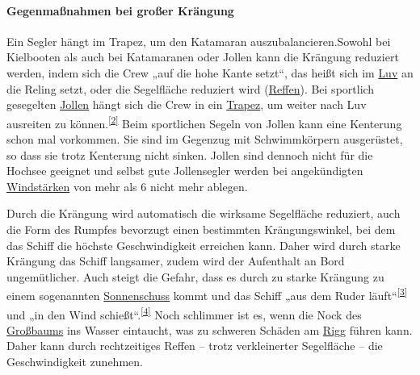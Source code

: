 \paragraph{Gegenmaßnahmen bei großer Krängung}

Ein Segler hängt im Trapez, um den Katamaran auszubalancieren.Sowohl bei Kielbooten als auch bei Katamaranen oder Jollen kann die Krängung reduziert werden, indem sich die Crew „auf die hohe Kante setzt“, das heißt sich im \href{https://de.wikipedia.org/wiki/Luv_und_Lee}{Luv} an die Reling setzt, oder die Segelfläche reduziert wird (\href{https://de.wikipedia.org/wiki/Reffen}{Reffen}). Bei sportlich gesegelten \href{https://de.wikipedia.org/wiki/Jolle}{Jollen} hängt sich die Crew in ein \href{https://de.wikipedia.org/wiki/Trapez_(Segeln)}{Trapez}, um weiter nach Luv ausreiten zu können.\textsuperscript{\href{https://de.wikipedia.org/wiki/Stabilit\%C3\%A4t_(Schiffsk\%C3\%B6rper)\#cite_note-2}{[2]}} Beim sportlichen Segeln von Jollen kann eine Kenterung schon mal vorkommen. Sie sind im Gegenzug mit Schwimmkörpern ausgerüstet, so dass sie trotz Kenterung nicht sinken. Jollen sind dennoch nicht für die Hochsee geeignet und selbst gute Jollensegler werden bei angekündigten \href{https://de.wikipedia.org/wiki/Beaufort-Skala}{Windstärken} von mehr als 6 nicht mehr ablegen. 

Durch die Krängung wird automatisch die wirksame Segelfläche reduziert, auch die Form des Rumpfes bevorzugt einen bestimmten Krängungswinkel, bei dem das Schiff die höchste Geschwindigkeit erreichen kann. Daher wird durch starke Krängung das Schiff langsamer, zudem wird der Aufenthalt an Bord ungemütlicher. Auch steigt die Gefahr, dass es durch zu starke Krängung zu einem sogenannten \href{https://de.wikipedia.org/wiki/Sonnenschuss}{Sonnenschuss} kommt und das Schiff „aus dem Ruder läuft“\textsuperscript{\href{https://de.wikipedia.org/wiki/Stabilit\%C3\%A4t_(Schiffsk\%C3\%B6rper)\#cite_note-3}{[3]}} und „in den Wind schießt“.\textsuperscript{\href{https://de.wikipedia.org/wiki/Stabilit\%C3\%A4t_(Schiffsk\%C3\%B6rper)\#cite_note-4}{[4]}} Noch schlimmer ist es, wenn die Nock des \href{https://de.wikipedia.org/wiki/Baum_(Segeln)}{Großbaums} ins Wasser eintaucht, was zu schweren Schäden am \href{https://de.wikipedia.org/wiki/Takelage}{Rigg} führen kann. Daher kann durch rechtzeitiges Reffen – trotz verkleinerter Segelfläche – die Geschwindigkeit zunehmen. 

